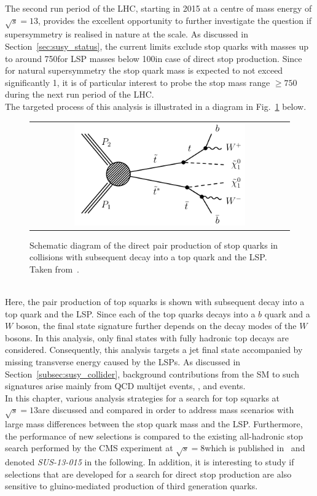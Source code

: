 The second run period of the LHC, starting in 2015 at a centre of mass energy of $\sqrt{s} = 13$\tev, provides the excellent opportunity to further investigate the question if supersymmetry is realised in nature at the \tev scale. As discussed in Section~\ref{sec:susy_status}, the current limits exclude stop quarks with masses up to around 750\gev for LSP masses below 100\gev in case of direct stop production. Since for natural supersymmetry the stop quark mass is expected to not exceed significantly 1\tev, it is of particular interest to probe the stop mass range $\ge 750$\gev during the next run period of the LHC. \\
The targeted process of this analysis is illustrated in a diagram in Fig.~\ref{fig:T2tt} below.  
\begin{figure}[!h]
  \centering
  \begin{tabular}{c}
                \includegraphics[width=0.68\textwidth]{figures/T2tt.pdf} 
  \end{tabular}
  \caption{Schematic diagram of the direct pair production of stop quarks in \pp collisions with subsequent decay into a top quark and the LSP. Taken from~\cite{bib:CMS:PhysicsResultsSUS}. }
  \label{fig:T2tt}
\end{figure}
\\   
Here, the pair production of top squarks is shown with subsequent decay into a top quark and the LSP. Since each of the top quarks decays into a $b$ quark and a $W$ boson, the final state signature further depends on the decay modes of the $W$ bosons. In this analysis, only final states with fully hadronic top decays are considered. Consequently, this analysis targets a jet final state accompanied by missing transverse energy caused by the LSPs. As discussed in Section~\ref{subsec:susy_collider}, background contributions from the SM to such signatures arise mainly from QCD multijet events, \WJets, \ZJets and \ttbar events. \\
In this chapter, various analysis strategies for a search for top squarks at $\sqrt{s} = 13$\tev are discussed and compared in order to address mass scenarios with large mass differences between the stop quark mass and the LSP. Furthermore, the performance of new selections is compared to the existing all-hadronic stop search performed by the CMS experiment at $\sqrt{s} = 8$\tev which is published in~\cite{CMS-PAS-SUS-13-015} and denoted \textit{SUS-13-015} in the following. In addition, it is interesting to study if selections that are developed for a search for direct stop production are also sensitive to gluino-mediated production of third generation quarks. 

